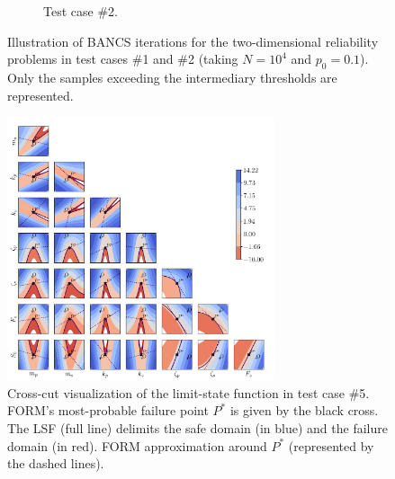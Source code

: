 \begin{figure}
\begin{subfigure}[b]{0.49\linewidth}
        \caption{Test case \#2.}
    \end{subfigure}
    \caption{Illustration of BANCS iterations for the two-dimensional reliability problems in test cases \#1 and \#2  (taking $N=10^4$ and $p_0=0.1$). 
    Only the samples exceeding the intermediary thresholds are represented.}
    \label{fig:2D_toycase_reliability}
\end{figure}


\begin{figure}
    \centering
    \includegraphics[width=0.7\textwidth]{part3/figures/BANCS/crosscut_oscillator.png}
    \caption{Cross-cut visualization of the limit-state function in test case \#5. 
    FORM's most-probable failure point $P^*$ is given by the black cross. 
    The LSF (full line) delimits the safe domain (in blue) and the failure domain (in red). 
    FORM approximation around $P^*$ (represented by the dashed lines).}
    \label{fig:crosscut_oscillator}
\end{figure}


